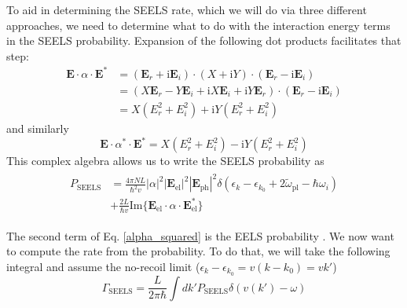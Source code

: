 \documentclass [11pt, proquest] {uwthesis}[2016/11/22]
\begin{document}
To aid in determining the SEELS rate, which we will do via three different approaches, we need to determine what to do with the interaction energy terms in the SEELS probability. Expansion of the following dot products facilitates that step:
\begin{equation}
\begin{aligned}
\textbf{E}\cdot\alpha\cdot\textbf{E}^* &= (\textbf{E}_r+\textrm{i}\textbf{E}_i)\cdot(X+\textrm{i}Y)\cdot(\textbf{E}_r-\textrm{i}\textbf{E}_i)\\
& = (X\textbf{E}_r - Y\textbf{E}_i + \textrm{i}X\textbf{E}_i + \textrm{i}Y\textbf{E}_r)\cdot(\textbf{E}_r-\textrm{i}\textbf{E}_i)\\
& = X(E_r^2 + E_i^2) + \textrm{i}Y(E_r^2 + E_i^2)
\label{alpha_1}
\end{aligned}
\end{equation}
and similarly 
\begin{equation}
\textbf{E}\cdot\alpha^*\cdot\textbf{E}^* = X(E_r^2 + E_i^2) -\textrm{i}Y(E_r^2 + E_i^2)
\label{alpha_2}
\end{equation}
This complex algebra allows us to write the SEELS probability as
\begin{align}
\begin{split}
  P_{\textrm{SEELS}} &= \frac{4\pi NL}{\hbar^2v}|\alpha|^2|\textbf{E}_{\textrm{el}}|^2|\textbf{E}_{\textrm{ph}}|^2\delta(\epsilon_k - \epsilon_{k_0} + 2\tilde{\omega}_{\textrm{pl}} - \hbar\omega_i)\\
  &+ \frac{2L}{\hbar v}\textrm{Im}\{\textbf{E}_{\textrm{el}}\cdot\alpha\cdot\textbf{E}_{\textrm{el}}^*\}
  \label{alpha_squared}
  \end{split}
\end{align}

The second term of Eq. \ref{alpha_squared} is the EELS probability \cite{EEGS}. We now want to compute the rate from the probability. To do that, we will take the following integral and assume the no-recoil limit ($\epsilon_k - \epsilon_{k_0} = v(k-k_0) = vk'$)
\begin{equation}
\Gamma_{\textrm{SEELS}} = \frac{L}{2\pi\hbar}\int dk' P_{\textrm{SEELS}} \delta(v(k')-\omega)
\label{prob_to_rate}
\end{equation}
\end{document}
